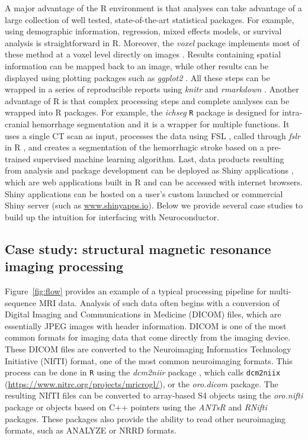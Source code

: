 \documentclass[]{elsarticle} %
\newcommand{\pkg}[1]{\emph{#1}}
\newcommand{\rlang}{\texttt{R}}
\begin{document}
A major advantage of the R environment is that analyses can take advantage of a large collection of well tested,  state-of-the-art statistical packages. For example, using demographic information, regression, mixed effects models, or survival analysis is straightforward in R.  Moreover, the \pkg{voxel} package implements most of these method at a voxel level directly on images \citep{voxel}.  Results containing spatial information can be mapped back to an image, while other results can be displayed using plotting packages such as \pkg{ggplot2} \citep{ggplot2}.  All these steps can be wrapped in a series of reproducible reports using \pkg{knitr} and \pkg{rmarkdown} \citep{rmarkdown,knitr}. Another advantage of R is that complex processing steps and complete analyses can be wrapped into R packages. For example, the \pkg{ichseg} \cite{ichseg,muschelli2016pitch} {\rlang} package is designed for intra-cranial hemorrhage segmentation and it is a wrapper for multiple functions. It uses a  single CT scan as input, processes the data using FSL \citep{fsl}, called through \pkg{fslr} in R \citep{fslr}, and creates a segmentation of the hemorrhagic stroke based on a pre-trained supervised machine learning algorithm. Last, data products resulting from analysis and package development can be deployed as Shiny applications \citep{shiny}, which are web applications built in R and can be accessed with internet browsers.  Shiny applications can be hosted on a user's custom launched or commercial Shiny server (such as \url{www.shinyapps.io}). Below we provide several case studies to build up the intuition for interfacing with  Neuroconductor.

\subsection{Case study: structural magnetic resonance imaging processing} Figure~\ref{fig:flow} provides an example of a typical processing pipeline for multi-sequence MRI data. Analysis of such data often begins with a conversion of Digital Imaging and Communications in Medicine (DICOM) files, which are essentially JPEG images with header information.  DICOM is one of the most common formats for imaging data that come directly from the imaging device.  These DICOM files are converted to the Neuroimaging Informatics Technology Initiative (NIfTI) format, one of the most common neuroimaging formats. This process can be done in {\rlang} using the \pkg{dcm2niir} package \citep{dcm2niir}, which calls \texttt{dcm2niix} (\url{https://www.nitrc.org/projects/mricrogl/}), or the \pkg{oro.dicom} \cite{oro.nifti} package. The resulting NIfTI files can be converted to array-based S4 objects  using the \pkg{oro.nifti} \cite{oro.nifti} package or objects based on C++ pointers using the \pkg{ANTsR} \cite{antsr} and \pkg{RNifti} \cite{Rnifti} packages.  These packages also provide the ability to read other neuroimaging formats, such as ANALYZE or NRRD formats.
 
\end{document}
